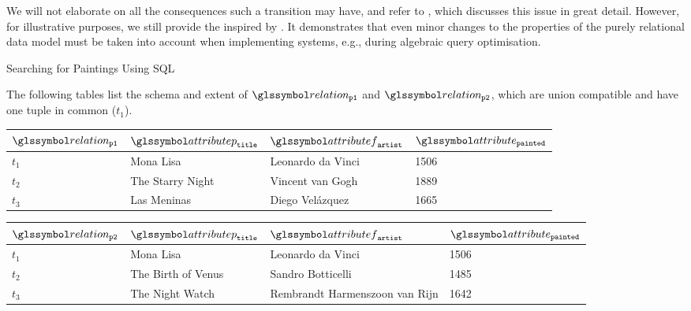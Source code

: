 We will not elaborate on all the consequences such a transition may have, and refer to \cite{Garcia:2009Database}, which discusses this issue in great detail. However, for illustrative  purposes, we still provide the  inspired by \cite{Garcia:2009Database}. It demonstrates that even minor changes to the properties of the purely relational data model must be taken into account when implementing systems, e.g., during algebraic query optimisation.

\begin{example}[label=example:bag_vs_set]{Searching for Paintings Using SQL}{}

    The following tables list the schema and extent of $\relation_{\mathtt{p1}}$ and $\relation_{\mathtt{p2}}$, which are union compatible and have one tuple in common ($t_1$).

    \begin{center}
        \begin{tabular}{ l || l | l | l |}
            $\relation_{\mathtt{p1}}$ & $\attributep_{\mathtt{title}}$  & $\attributef_{\mathtt{artist}}$  & $\attribute_{\mathtt{painted}}$ \\ 
            \hline
            \hline
            $t_1$ & Mona Lisa &  Leonardo da Vinci & 1506 \\
            \hline
            $t_2$ & The Starry Night & Vincent van Gogh & 1889 \\
            \hline
            $t_3$ & Las Meninas & Diego Velázquez & 1665 \\
            \hline
        \end{tabular}
    \end{center}

    \begin{center}
        \begin{tabular}{ l || l | l | l |}
            $\relation_{\mathtt{p2}}$ & $\attributep_{\mathtt{title}}$  & $\attributef_{\mathtt{artist}}$  & $\attribute_{\mathtt{painted}}$ \\ 
            \hline
            \hline
            $t_1$ & Mona Lisa &  Leonardo da Vinci & 1506 \\
            \hline
            $t_2$ & The Birth of Venus & Sandro Botticelli & 1485 \\
            \hline
            $t_3$ & The Night Watch & Rembrandt Harmenszoon van Rijn & 1642 \\
            \hline
        \end{tabular}
    \end{center}
    

\end{example}
